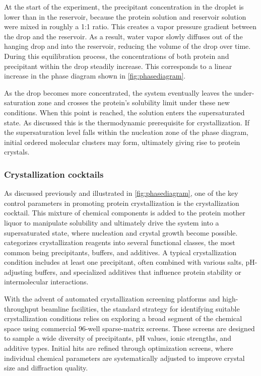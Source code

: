 At the start of the experiment, the precipitant concentration in the droplet is lower than in the reservoir, because the protein solution and reservoir solution were mixed in roughly a 1:1 ratio. This creates a vapor pressure gradient between the drop and the reservoir. As a result, water vapor slowly diffuses out of the hanging drop and into the reservoir, reducing the volume of the drop over time. During this equilibration process, the concentrations of both protein and precipitant within the drop steadily increase. This corresponds to a linear increase in the phase diagram shown in \autoref{fig:phasediagram}. 

As the drop becomes more concentrated, the system eventually leaves the under-saturation zone and crosses the protein’s solubility limit under these new conditions. When this point is reached, the solution enters the supersaturated state. As discussed this is the thermodynamic prerequisite for crystallization. If the supersaturation level falls within the nucleation zone of the phase diagram, initial ordered molecular clusters may form, ultimately giving rise to protein crystals. 

\subsubsection*{Crystallization cocktails}
As discussed previously and illustrated in \autoref{fig:phasediagram}, one of the key control parameters in promoting protein crystallization is the crystallization cocktail. This mixture of chemical components is added to the protein mother liquor to manipulate solubility and ultimately drive the system into a supersaturated state, where nucleation and crystal growth become possible. \textcite{Rupp2009} categorizes crystallization reagents into several functional classes, the most common being precipitants, buffers, and additives. A typical crystallization condition includes at least one precipitant, often combined with various salts, pH-adjusting buffers, and specialized additives that influence protein stability or intermolecular interactions.

With the advent of automated crystallization screening platforms and high-throughput beamline facilities, the standard strategy for identifying suitable crystallization conditions relies on exploring a broad segment of the chemical space using commercial 96-well sparse-matrix screens. These screens are designed to sample a wide diversity of precipitants, pH values, ionic strengths, and additive types. Initial hits are refined through optimization screens, where individual chemical parameters are systematically adjusted to improve crystal size and diffraction quality.

